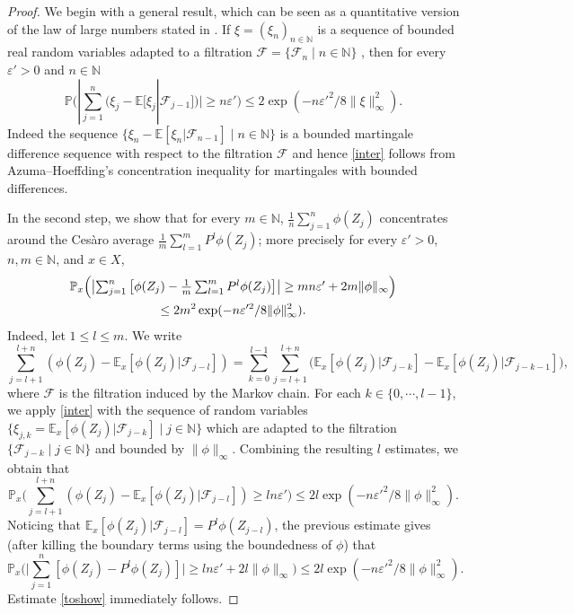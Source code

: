 \documentclass[10pt]{amsart}
\let\epsilon\varepsilon
\let\sep\mid
\let\ts\textstyle
\theoremstyle{plain}
\theoremstyle{definition}
\newcommand\E{\mathbb{E}}
\newcommand\p{\mathbb{P}}
\newcommand\N{\mathbb{N}}
\begin{document}
\begin{proof}
We begin with a general result, which can be seen as a quantitative version of the law of large numbers stated in \cite[Th.\,1.6]{BQ.book}. If $\xi=(\xi_n)_{n\in \N}$ is a sequence of bounded real random variables adapted to a filtration $\mathcal{F}=\{\mathcal{F}_n \sep n\in \N\}$ , then for every $\epsilon'>0$ and $n\in \N$
\begin{equation}\label{inter}
\p \bigl(|\ts\sum_{j=1}^n(\xi_j - \E[\xi_j| \mathcal{F}_{j-1}])| \geq n\epsilon'\bigr)\leq 2 \exp(-n\epsilon'^2/8\|\xi\|_{\infty}^2).\end{equation}
Indeed the sequence $\{\xi_n-\E[\xi_n| \mathcal{F}_{n-1}] \sep n\in \N\}$ is a bounded martingale difference sequence with respect to the filtration $\mathcal{F}$ and hence \eqref{inter} follows from Azuma--Hoeffding's concentration inequality for martingales with bounded differences.

In the second step, we show that for every $m\in \N$, $\frac{1}{n}\sum_{j=1}^n{\phi(Z_j)}$ concentrates around the Cesàro average $\frac{1}{m}\sum_{l=1}^m{P^l \phi(Z_j)}$; more precisely for every $\epsilon'>0$, $n,m\in \N$, and $x \in X$,\vspace*{-3pt}
\begin{multline}\label{toshow}
\p_x\Bigl(\bigl|\ts\sum_{j=1}^{n}
{\bigl[\phi(Z_{j})-\frac{1}{m}\sum_{l=1}^mP^l\phi(Z_{j})}\bigr]\bigr| \geq m n \epsilon'+2m\|\phi\|_{\infty}\Bigr)\\
\leq 2 m^2
\exp(-n\epsilon'^2/8\|\phi\|_{\infty}^2).
\end{multline}
Indeed, let $1\leq l \leq m$. We write\vspace*{-3pt}
\[
\sum_{j=l+1}^{l+n}
{(\phi(Z_{j})-\E_x[\phi(Z_j) | \mathcal{F}_{j-l}])}=
\sum_{k=0}^{l-1} \sum_{j=l+1}^{l+n}{
(\E_x[\phi(Z_j)| \mathcal{F}_{j-k}]-
\E_x[\phi(Z_j)|
\mathcal{F}_{j-k-1}]}),
\]
where $\mathcal{F}$ is the filtration induced by the Markov chain.
For each $k\in \{0,\cdots, l-1\}$, we apply \eqref{inter} with
the sequence
of random variables
$\{\xi_{j,k}=\E_x[\phi(Z_j)| \mathcal{F}_{j-k}] \sep j\in \N\}$ which are adapted to the filtration
$\{\mathcal{F}_{j-k}\sep j\in \N\}$ and bounded by $\|\phi\|_{\infty}$. Combining the resulting $l$ estimates, we obtain that
\[
\p_x\bigl(\ts\sum_{j=l+1}^{l+n}
(\phi(Z_{j})-\E_x[\phi(Z_j)|\mathcal{F}_{j-l}]) \geq l n \epsilon'\bigr)\leq 2 l
\exp(-n\epsilon'^2/8\|\phi\|_{\infty}^2).
\]
Noticing that $\E_x[\phi(Z_j)|\mathcal{F}_{j-l}]=P^l\phi(Z_{j-l})$, the previous estimate gives (after killing the boundary terms using the boundedness of $\phi$) that
\[
\p_x\bigl(\bigl|\ts\sum_{j=1}^{n}
{[\phi(Z_{j})-P^l\phi(Z_{j})]}\bigr| \geq l n \epsilon'+2l\|\phi\|_{\infty}\bigr)\leq 2l
\exp(-n\epsilon'^2/8\|\phi\|_{\infty}^2).
\]
Estimate \eqref{toshow} immediately follows.


\end{proof}
\end{document}
